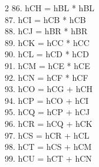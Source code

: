 \documentclass[10pt]{article}
\begin{document}
\begin{multicols}{2}
86. hCH = hBL * hBL\\
87. hCI = hCB * hCB\\
88. hCJ = hBR * hBR\\
89. hCK = hCC * hCC\\
90. hCL = hCD * hCD\\
91. hCM = hCE * hCE\\
92. hCN = hCF * hCF\\
93. hCO = hCG + hCH\\
94. hCP = hCO + hCI\\
95. hCQ = hCP + hCJ\\
96. hCR = hCQ + hCK\\
97. hCS = hCR + hCL\\
98. hCT = hCS + hCM\\
99. hCU = hCT + hCN\\

\end{multicols}
\end{document}
